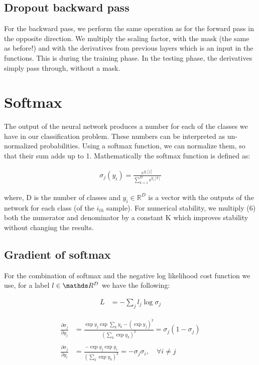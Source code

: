 \documentclass[12pt,twoside]{article}
\begin{document}
\subsection{Dropout backward pass}

For the backward pass, we perform the same operation as for the forward pass in the opposite direction. We multiply the scaling factor, with the mask (the same as before!) and with the derivatives from previous layers which is an input in the functions. This is during the training phase. In the testing phase, the derivatives simply pass through, without a mask. 


\section{Softmax}

The output of the neural network produces a number for each of the classes we have in our classification problem. These numbers can be interpreted as un-normalized probabilities. Using a softmax function, we can normalize them, so that their sum adds up to 1.
Mathematically the softmax function is defined as:

\begin{align}
\sigma_j (y_i) = \frac{e^{y_i[j]}}{\sum_{k=1}^{D} e^{y_i[k]}}
\end{align}

where, D is the number of classes and $y_i \in \mathbb{R}^D$ is a vector with the outputs of the network for each class (of the $i_{th}$ sample). For numerical stability, we multiply (6) both the numerator and denominator by a constant K which improves stability without changing the results.



\subsection{Gradient of softmax}
For the combination of softmax and the negative log likelihood cost function we use, for a label $l \in \R^{D}$ we have the following:

\begin{align*}
L &= - \sum_j l_j \log \sigma_j
\end{align*}

\begin{align*}
\frac{\partial \sigma_j}{\partial y_j} &= \frac{\exp y_j \exp \sum_k y_k - (\exp y_j)^2}{(\sum_k \exp y_k)^2}= \sigma_j (1 - \sigma_j)\\
\\
\frac{\partial \sigma_j}{\partial y_i} &= \frac{-\exp y_j \exp y_i}{(\sum_k \exp y_k)^2}= -\sigma_j \sigma_i, \quad \forall i \neq j
\end{align*}
\end{document}
